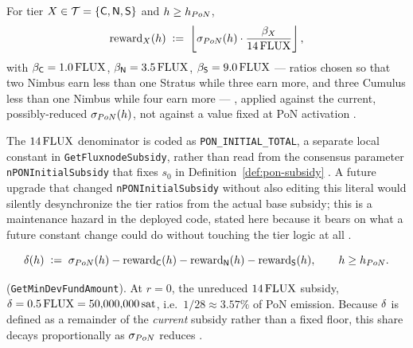 \begin{definition}
For tier $X \in \mathcal{T} = \{\mathsf{C},\mathsf{N},\mathsf{S}\}$ and $h \ge h_{PoN}$,
$$
\mathrm{reward}_X(h) \;\vcentcolon=\; \left\lfloor \sigma_{PoN}(h) \cdot \frac{\beta_{X}}{14\,\mathrm{FLUX}} \right\rfloor,
$$
with $\beta_{\mathsf{C}} = 1.0\,\mathrm{FLUX}$, $\beta_{\mathsf{N}} = 3.5\,\mathrm{FLUX}$, $\beta_{\mathsf{S}} = 9.0\,\mathrm{FLUX}$ --- ratios chosen
so that two Nimbus earn less than one Stratus while three earn more, and three Cumulus less than one
Nimbus while four earn more \citep{fluxrewardmodel} ---
\shipped {}, applied against the current, possibly-reduced
$\sigma_{PoN}(h)$, not against a value fixed at PoN activation
\shipped {}.
\end{definition}

The $14\,\mathrm{FLUX}$ denominator is coded as \texttt{PON\_INITIAL\_TOTAL}, a separate local constant in
\texttt{Get\allowbreak{}Fluxnode\allowbreak{}Subsidy}, rather than read from the consensus parameter
\texttt{n\allowbreak{}PONInitial\allowbreak{}Subsidy} that fixes $s_0$ in Definition~\ref{def:pon-subsidy}
\shipped {}. A future upgrade that changed
\texttt{n\allowbreak{}PONInitial\allowbreak{}Subsidy} without also editing this literal would silently desynchronize the
tier ratios from the actual base subsidy; this is a maintenance hazard in the deployed code, stated
here because it bears on what a future constant change could do without touching the tier logic at
all \shipped {}.

\begin{definition}
$$
\delta(h) \;\vcentcolon=\; \sigma_{PoN}(h) - \mathrm{reward}_{\mathsf{C}}(h) - \mathrm{reward}_{\mathsf{N}}(h) - \mathrm{reward}_{\mathsf{S}}(h), \qquad h \ge h_{PoN}.
$$
\end{definition}
\shipped {} (\texttt{Get\allowbreak{}Min\allowbreak{}Dev\allowbreak{}Fund\allowbreak{}Amount}). At $r=0$, the
unreduced $14\,\mathrm{FLUX}$ subsidy, $\delta = 0.5\,\mathrm{FLUX} = 50{,}000{,}000\,\mathrm{sat}$, i.e.\ $1/28 \approx 3.57\%$
of PoN emission. Because $\delta$ is defined as a remainder of the \emph{current} subsidy rather
than a fixed floor, this share decays proportionally as $\sigma_{PoN}$ reduces
\shipped {}.

